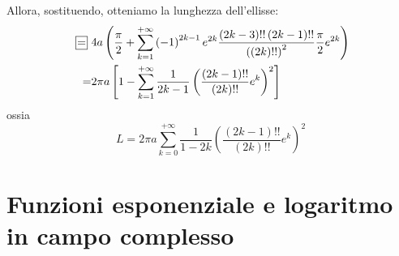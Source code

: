 Allora, sostituendo, otteniamo la lunghezza dell'ellisse:
\begin{align*}
	\squarequal&4a\left(\frac{\pi}{2}+\sum_{k=1}^{+\infty}\left(-1\right)^{2k-1}e^{2k}\frac{\left(2k-3\right)!!\left(2k-1\right)!!}{\left(\left(2k\right)!!\right)^2}\frac{\pi}{2}e^{2k}\right)\\
	=&2\pi a\left[1-\sum_{k=1}^{+\infty}\frac{1}{2k-1}\left(\frac{\left(2k-1\right)!!}{\left(2k\right)!!}e^k\right)^2\right]
\end{align*}
ossia
\begin{equation}
	L=2\pi a\sum_{k=0}^{+\infty}\frac{1}{1-2k}\left(\frac{\left(2k-1\right)!!}{\left(2k\right)!!}e^k\right)^2
\end{equation}
\section{Funzioni esponenziale e logaritmo in campo complesso}
